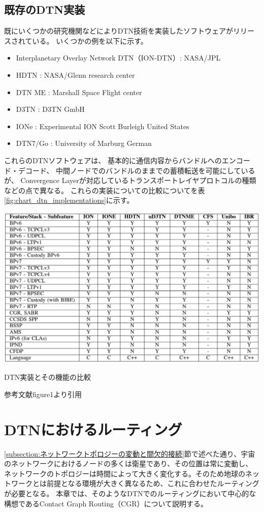 \subsection{既存のDTN実装}
既にいくつかの研究機関などによりDTN技術を実装したソフトウェアがリリースされている。 いくつかの例を以下に示す。 
\begin{itemize}
    \item Interplanetary Overlay Network DTN（ION-DTN）: NASA/JPL
    \item HDTN : NASA/Glenn research center
    \item DTN ME : Marshall Space Flight center
    \item \textmu D3TN : D3TN GmbH
    \item IONe : Experimental ION Scott Burleigh United States 
    \item DTN7/Go : University of Marburg German
\end{itemize}
これらのDTNソフトウェアは、 基本的に通信内容からバンドルへのエンコード・デコード、 
中間ノードでのバンドルのままでの蓄積転送を可能にしているが、 
Convergence Layerが対応しているトランスポートレイヤプロトコルの種類などの点で異なる。 
これらの実装についての比較についてを表\ref{fig:chart_dtn_implementations}に示す。   
\begin{table}[tbh]
    \centering
    \includegraphics[width=0.7\textheight]{img/chart_dtn_implementations.pdf}
    \caption{DTN実装とその機能の比較 }
    \label{fig:chart_dtn_implementations}
    \begin{minipage}{\textwidth}
        \centering
        参考文献\cite{dtn_implementations}figure1より引用
    \end{minipage}
\end{table}



\section{DTNにおけるルーティング}
\label{section:宇宙インターネットにおけるルーティング}
\ref{subsection:ネットワークトポロジーの変動と間欠的接続}節で述べた通り、宇宙のネットワークにおけるノードの多くは衛星であり、その位置は常に変動し、
ネットワークのトポロジーは時間によって大きく変化する。そのため地球のネットワークとは前提となる環境が大きく異なるため、これに合わせたルーティングが必要となる。
本章では、そのようなDTNでのルーティングにおいて中心的な構想であるContact Graph Routing（CGR）\cite{Fraire2021}について説明する。


